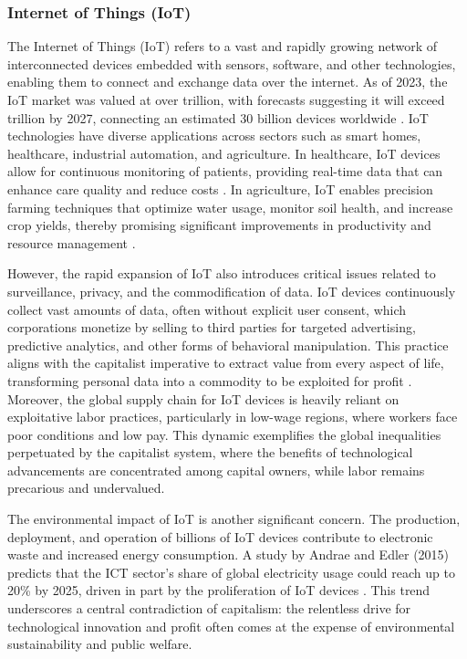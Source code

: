 \begin{refsection}
\subsubsection{Internet of Things (IoT)}

The Internet of Things (IoT) refers to a vast and rapidly growing network of interconnected devices embedded with sensors, software, and other technologies, enabling them to connect and exchange data over the internet. As of 2023, the IoT market was valued at over  trillion, with forecasts suggesting it will exceed  trillion by 2027, connecting an estimated 30 billion devices worldwide \cite[pp.~2787-2790]{atzori2014internet}. IoT technologies have diverse applications across sectors such as smart homes, healthcare, industrial automation, and agriculture. In healthcare, IoT devices allow for continuous monitoring of patients, providing real-time data that can enhance care quality and reduce costs \cite[pp.~88-91]{greengard2021internet}. In agriculture, IoT enables precision farming techniques that optimize water usage, monitor soil health, and increase crop yields, thereby promising significant improvements in productivity and resource management \cite[pp.~70-73]{wolfert2017big}.

However, the rapid expansion of IoT also introduces critical issues related to surveillance, privacy, and the commodification of data. IoT devices continuously collect vast amounts of data, often without explicit user consent, which corporations monetize by selling to third parties for targeted advertising, predictive analytics, and other forms of behavioral manipulation. This practice aligns with the capitalist imperative to extract value from every aspect of life, transforming personal data into a commodity to be exploited for profit \cite[pp.~43-46]{wolfert2017big}. Moreover, the global supply chain for IoT devices is heavily reliant on exploitative labor practices, particularly in low-wage regions, where workers face poor conditions and low pay. This dynamic exemplifies the global inequalities perpetuated by the capitalist system, where the benefits of technological advancements are concentrated among capital owners, while labor remains precarious and undervalued.

The environmental impact of IoT is another significant concern. The production, deployment, and operation of billions of IoT devices contribute to electronic waste and increased energy consumption. A study by Andrae and Edler (2015) predicts that the ICT sector's share of global electricity usage could reach up to 20\% by 2025, driven in part by the proliferation of IoT devices \cite[pp.~63-67]{andrae2015global}. This trend underscores a central contradiction of capitalism: the relentless drive for technological innovation and profit often comes at the expense of environmental sustainability and public welfare.


\end{refsection}
